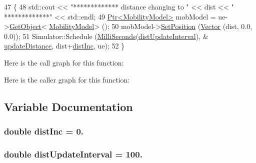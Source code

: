 \begin{DoxyCode}
47 \{
48   std::cout << \textcolor{stringliteral}{"************* distance changing to "} << dist << \textcolor{stringliteral}{" *************"} << std::endl;
49   \hyperlink{classns3_1_1Ptr}{Ptr<MobilityModel>} mobModel = ue->\hyperlink{classns3_1_1Object_a13e18c00017096c8381eb651d5bd0783}{GetObject}<
      \hyperlink{classns3_1_1MobilityModel}{MobilityModel}> ();
50   mobModel->\hyperlink{classns3_1_1MobilityModel_ac584b3d5a309709d2f13ed6ada1e7640}{SetPosition} (\hyperlink{classns3_1_1Vector3D_a7e59b47bc94c9cb1dadff68c1d0112d8}{Vector} (dist, 0.0, 0.0));
51         Simulator::Schedule (\hyperlink{group__timecivil_gaf26127cf4571146b83a92ee18679c7a9}{MilliSeconds}(\hyperlink{mmwave-tdma_8cc_a5366a103b1af38305a434287c90c58b9}{distUpdateInterval}), &
      \hyperlink{mmwave-tdma_8cc_a13907b59ad3cca66e40772b111113d8e}{updateDistance}, dist+\hyperlink{mmwave-tdma_8cc_ab6f0966775123c3c56e8b826c0a659d5}{distInc}, ue);
52 \}
\end{DoxyCode}


Here is the call graph for this function\+:




Here is the caller graph for this function\+:




\subsection{Variable Documentation}
\subsubsection[{\texorpdfstring{dist\+Inc}{distInc}}]{\setlength{\rightskip}{0pt plus 5cm}double dist\+Inc = 0.}\hypertarget{mmwave-tdma_8cc_ab6f0966775123c3c56e8b826c0a659d5}{}\label{mmwave-tdma_8cc_ab6f0966775123c3c56e8b826c0a659d5}
\subsubsection[{\texorpdfstring{dist\+Update\+Interval}{distUpdateInterval}}]{\setlength{\rightskip}{0pt plus 5cm}double dist\+Update\+Interval = 100.}\hypertarget{mmwave-tdma_8cc_a5366a103b1af38305a434287c90c58b9}{}\label{mmwave-tdma_8cc_a5366a103b1af38305a434287c90c58b9}

